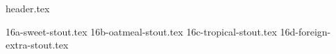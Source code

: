 \clearpage
{}
\divisorLine
{header.tex}
\begin{multicols*}{2}
{16a-sweet-stout.tex}
{16b-oatmeal-stout.tex}
{16c-tropical-stout.tex}
{16d-foreign-extra-stout.tex}
\end{multicols*}